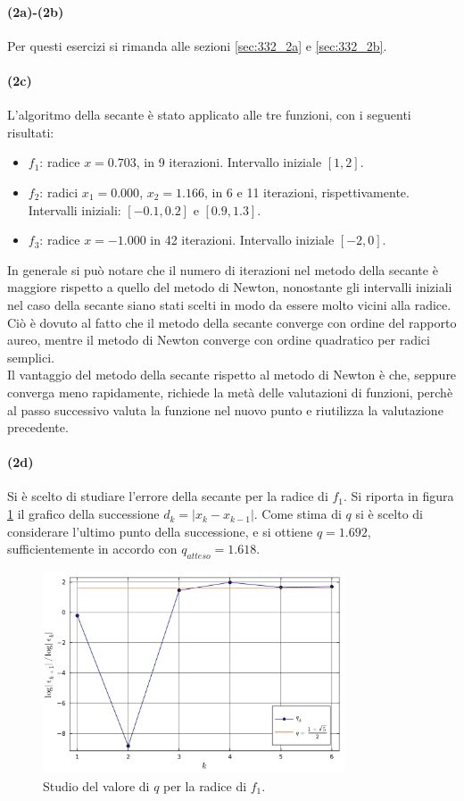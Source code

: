 \documentclass[letterpaper, 12pt]{article}
\numberwithin{equation}{section}    %
\begin{document}
\paragraph{(2a)-(2b)} Per questi esercizi si rimanda alle sezioni \ref{sec:332_2a} e \ref{sec:332_2b}.

\paragraph{(2c)} L'algoritmo della secante è stato applicato alle tre funzioni, con i seguenti risultati:
\begin{itemize}
    \item $f_1$: radice $x = 0.703$, in 9 iterazioni. Intervallo iniziale $[1,2]$.
    \item $f_2$: radici $x_1 = 0.000$, $x_2 = 1.166$, in 6 e 11 iterazioni, rispettivamente. Intervalli iniziali:
    $[-0.1,0.2]$ e $[0.9,1.3]$.
    \item $f_3$: radice $x = -1.000$ in 42 iterazioni. Intervallo iniziale $[-2,0]$.
\end{itemize}

In generale si può notare che il numero di iterazioni nel metodo della secante è maggiore rispetto 
a quello del metodo di Newton, nonostante gli intervalli iniziali nel caso della secante siano stati scelti 
in modo da essere molto vicini alla radice. Ciò è dovuto al fatto che il metodo della secante converge
con ordine del rapporto aureo, mentre il metodo di Newton converge con ordine quadratico per radici semplici. \\
Il vantaggio del metodo della secante rispetto al metodo di Newton è che, seppure converga meno rapidamente,
richiede la metà delle valutazioni di funzioni, perchè al passo successivo valuta la
funzione nel nuovo punto e riutilizza la valutazione precedente.
\paragraph{(2d) } Si è scelto di studiare l'errore della secante per la radice di $f_1$. Si riporta in figura
\ref{fig:es3_4_2_1} il grafico della successione $d_k = |x_k - x_{k-1}|$. Come stima di $q$ si è scelto di
considerare l'ultimo punto della successione, e si ottiene $q = 1.692$, sufficientemente in accordo con 
$q_{atteso} = 1.618$.
\begin{figure}[!ht]
    \centering
    \includegraphics[width=0.8\textwidth]{3421.pdf}
    \caption{Studio del valore di $q$ per la radice di $f_1$.}
    \label{fig:es3_4_2_1}
\end{figure}
\end{document}
